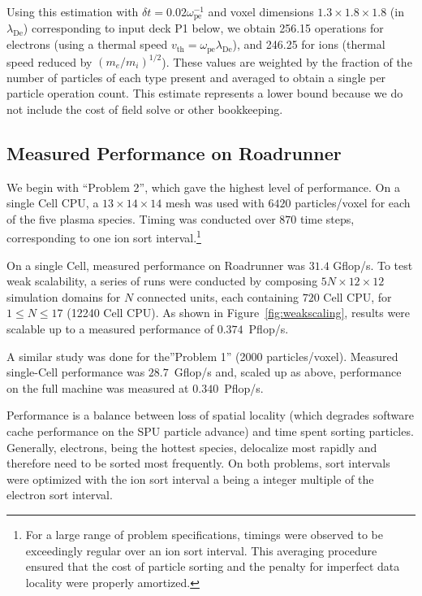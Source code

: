 \documentclass[journal,twoside]{IEEEtran}
\newcommand{\fig}[1]{Figure~\ref{fig:#1}}
\newcommand{\lde}      {\lambda_{\mathrm{De}}}
\newcommand{\wpe}      {\omega_{\mathrm{pe}}}
\begin{document}
Using this estimation with $\delta t = 0.02 \wpe^{-1}$ and voxel
dimensions $1.3 \times 1.8 \times 1.8$ (in $\lde$) corresponding to
input deck P1 below, we obtain 256.15 operations for electrons (using
a thermal speed $v_{\mathrm{th}} = \wpe \lde$), and 246.25 for ions
(thermal speed reduced by $(m_e/m_i)^{1/2}$).  These values are
weighted by the fraction of the number of particles of each type
present and averaged to obtain a single per particle operation count.
This estimate represents a lower bound because we do not include the
cost of field solve or other bookkeeping.

\subsection{Measured Performance on Roadrunner}

We begin with ``Problem 2'', which gave the highest level of
performance.  On a single Cell CPU, a $13 \times 14 \times 14$ mesh
was used with $6420$ particles/voxel for each of the five plasma
species.  Timing was conducted over $870$ time steps, corresponding to
one ion sort interval.\footnote{For a large range of problem
specifications, timings were observed to be exceedingly regular over
an ion sort interval.  This averaging procedure ensured that the cost
of particle sorting and the penalty for imperfect data locality were
properly amortized.}

On a single Cell, measured performance on Roadrunner was $31.4$
Gflop/s.  To test weak scalability, a series of runs were conducted by
composing $5N \times 12 \times 12$ simulation domains for $N$
connected units, each containing $720$ Cell CPU, for $1 \le N \le 17$
(12240 Cell CPU).  As shown in \fig{weakscaling}, results were scalable 
up to a measured performance of $0.374$~Pflop/s.

A similar study was done for the''Problem 1'' (2000 particles/voxel).
Measured single-Cell performance was $28.7$~Gflop/s and, scaled up as
above, performance on the full machine was measured at
$0.340$~Pflop/s.

Performance is a balance between loss of spatial locality (which
degrades software cache performance on the SPU particle advance) and
time spent sorting particles.  Generally, electrons, being the hottest
species, delocalize most rapidly and therefore need to be sorted most
frequently.  On both problems, sort intervals were optimized with the
ion sort interval a being a integer multiple of the electron sort
interval.
\end{document}
